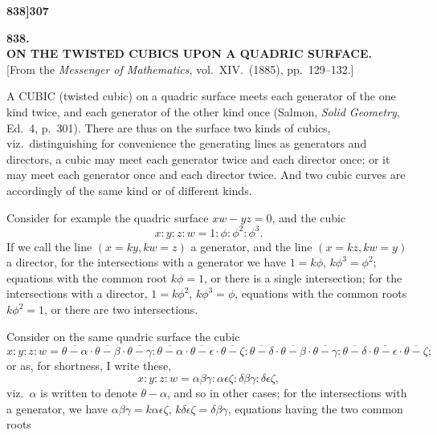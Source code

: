 \documentclass[12pt,a4paper]{article}
\theoremstyle{definition}
\begin{document}
\noindent\textbf{838]}\hfill\textbf{307}

\bigskip

\begin{center}
{\Large\textbf{838.}}\\[1em]
{\large\textbf{ON THE TWISTED CUBICS UPON A QUADRIC SURFACE.}}\\[1em]
[From the \textit{Messenger of Mathematics}, vol.\ XIV.\ (1885), pp.\ 129--132.]
\end{center}

\bigskip

\noindent A CUBIC (twisted cubic) on a quadric surface meets each generator of the one kind twice, and each generator of the other kind once (Salmon, \textit{Solid Geometry}, Ed.\ 4, p.\ 301). There are thus on the surface two kinds of cubics, viz.\ distinguishing for convenience the generating lines as generators and directors, a cubic may meet each generator twice and each director once; or it may meet each generator once and each director twice. And two cubic curves are accordingly of the same kind or of different kinds.

Consider for example the quadric surface $xw - yz = 0$, and the cubic
\[
x : y : z : w = 1 : \phi : \phi^2 : \phi^3.
\]
If we call the line $(x = ky, kw = z)$ a generator, and the line $(x = kz, kw = y)$ a director, for the intersections with a generator we have $1 = k\phi$, $k\phi^3 = \phi^2$; equations with the common root $k\phi = 1$, or there is a single intersection; for the intersections with a director, $1 = k\phi^2$, $k\phi^3 = \phi$, equations with the common roots $k\phi^2 = 1$, or there are two intersections.

Consider on the same quadric surface the cubic
\[
x : y : z : w = \overline{\theta - \alpha} \cdot \overline{\theta - \beta} \cdot \overline{\theta - \gamma} : \overline{\theta - \alpha} \cdot \overline{\theta - \epsilon} \cdot \overline{\theta - \zeta} : \overline{\theta - \delta} \cdot \overline{\theta - \beta} \cdot \overline{\theta - \gamma} : \overline{\theta - \delta} \cdot \overline{\theta - \epsilon} \cdot \overline{\theta - \zeta};
\]
or as, for shortness, I write these,
\[
x : y : z : w = \alpha\beta\gamma : \alpha\epsilon\zeta : \delta\beta\gamma : \delta\epsilon\zeta,
\]
viz.\ $\alpha$ is written to denote $\theta - \alpha$, and so in other cases; for the intersections with a generator, we have $\alpha\beta\gamma = k\alpha\epsilon\zeta$, $k\delta\epsilon\zeta = \delta\beta\gamma$, equations having the two common roots
\end{document}
